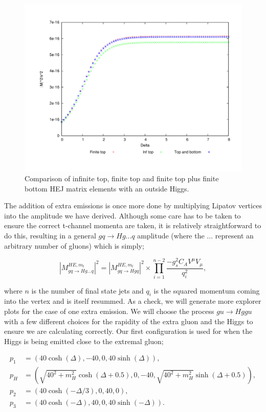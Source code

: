 \begin{figure}[H]
\centering
\includegraphics[scale=0.5]{Images/qg_qgH_compare_outside.pdf}
\caption{Comparison of infinite top, finite top and finite top plus finite bottom HEJ matrix elements with an outside Higgs.}
\label{fig:qg_qgh_compare_out}
\end{figure}

The addition of extra emissions is once more done by multiplying Lipatov vertices into the amplitude we have derived. Although some care has to be taken to ensure the correct t-channel momenta are taken, it is relatively straightforward to do this, resulting in a general $gq\to Hg...q$ amplitude (where the ... represent an arbitrary number of gluons) which is simply;

\begin{equation}
|M_{gq \to Hg...q}^{HE,m_t}|^2 = |M_{gq \to Hgq}^{HE,m_t}|^2 \times \prod_{i=1}^{n-2} \frac{-g_s^2C_A V^\mu V_\mu}{q_i^2},
\end{equation}

where $n$ is the number of final state jets and $q_i$ is the squared momentum coming into the vertex and is itself resummed. As a check, we will generate more explorer plots for the case of one extra emission. We will choose the process $gu \to Hggu$ with a few different choices for the rapidity of the extra gluon and the Higgs to ensure we are calculating correctly. Our first configuration is used for when the Higgs is being emitted close to the extremal gluon;

\begin{subequations}
\begin{align}
p_1 &= (40 \cosh(\Delta),-40,0,40 \sinh(\Delta)), \\
p_H &= (\sqrt{40^2+m_H^2} \cosh(\Delta+0.5), 0,-40,\sqrt{40^2+m_H^2}  \sinh(\Delta+0.5)), \\
p_2 &= (40 \cosh(-\Delta/3),0,40,0), \\
p_3 &= (40 \cosh(-\Delta),40,0,40 \sinh(-\Delta)).
\end{align}
\end{subequations}

